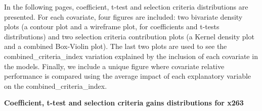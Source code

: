 \documentclass{article}
\begin{document}
In the following pages, coefficient, t-test and selection criteria distributions are presented. For each covariate, four figures are included: two bivariate density plots (a contour plot and a wireframe plot, for coefficients and t-tests distributions) and two selection criteria contribution plots (a Kernel density plot and a combined Box-Violin plot). The last two plots are used to see the combined\_criteria\_index variation explained by the inclusion of each covariate in the models. 
Finally, we include a unique figure where covariate relative performance is compared using the average impact of each explanatory variable on the combined\_criteria\_index.

\clearpage

\begin{center}
    \large{\textbf{Coefficient, t-test and selection criteria gains distributions for x263 }}
\end{center}

\vspace{-5mm}
\end{document}
